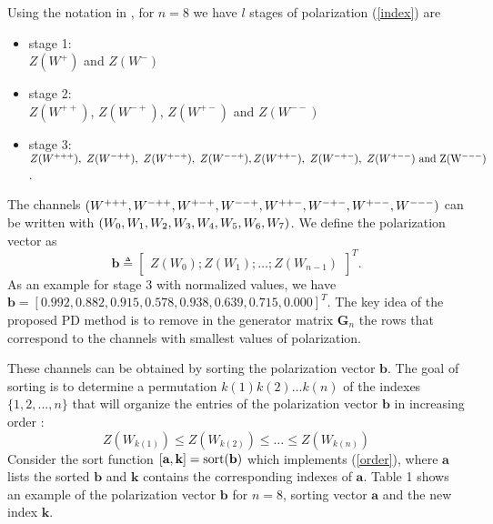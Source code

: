 \documentclass[10pt,twocolumn]{IEEEtran}
\begin{document}
Using the notation in \cite{Arikan}, for $n = 8$ we have $l$ stages of polarization (\ref{index}) are
\begin{itemize}
 \item stage 1: \\ $Z(W^+)$ and $Z(W^-)$
 \item stage 2: \\ $Z(W^{++})$, $Z(W^{-+})$, $Z(W^{+-})$ and $Z(W^{--})$
 \item stage 3: \\ $Z(W^{+++}),\ Z(W^{-++}),\ Z(W^{+-+}),\ Z(W^{--+}),\\ Z(W^{++-}),\ Z(W^{-+-}),\ Z(W^{+--})\ \rm and\ Z(W^{---})$.
\end{itemize}

The channels $(W^{+++},W^{-++},W^{+-+},W^{--+},W^{++-},
\\W^{-+-},W^{+--},W^{---})$ can be written with $(W_0, W_1, W_2,\\
W_3, W_4, W_5, W_6, W_7)$. We define the polarization vector as
\begin{equation}
\textbf{b} \triangleq \left[\begin{array}{cccc} Z(W_0); Z(W_1); \ldots; Z(W_{n-1})
\end{array}\right]^T.
\end{equation}
As an example for stage 3 with normalized values, we have
$\textbf{b} =[0.992,0.882,0.915,0.578,0.938,0.639,0.715,0.000]^T$.
The key idea of the proposed PD method is to remove in the generator
matrix $\textbf{G}_n$ the rows that correspond to the channels with
smallest values of polarization.

These channels can be obtained by sorting the polarization vector
$\textbf{b}$. The goal of sorting is to determine a permutation
$k(1)k(2) \ldots k(n)$ of the indexes $\{1,2,...,n\}$ that will
organize the entries of the polarization vector $\textbf{b}$ in
increasing order \cite{Knuth}:
\begin{equation}
Z(W_{k(1)}) \leq Z(W_{k(2)}) \leq \ldots \leq Z(W_{k(n)}) \label{order}
\end{equation}
Consider the sort function $[\textbf{a}, \textbf{k}]= \rm
sort(\textbf{b})$ which implements (\ref{order}), where $\textbf{a}$
lists the sorted $\textbf{b}$ and $\textbf{k}$ contains the
corresponding indexes of $\textbf{a}$. Table 1 shows an example of
the polarization vector $\textbf{b}$ for $n = 8$, sorting vector
$\textbf{a}$ and the new index $\textbf{k}$.
\end{document}
